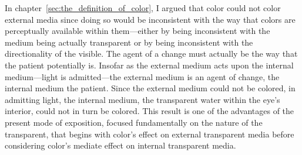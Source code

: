 In chapter~\ref{sec:the_definition_of_color}, I argued that color could not color external media since doing so would be inconsistent with the way that colors are perceptually available within them---either by being inconsistent with the medium being actually transparent or by being inconsistent with the directionality of the visible. The agent of a change must actually be the way that the patient potentially is. Insofar as the external medium acts upon the internal medium---light is admitted---the external medium is an agent of change, the internal medium the patient. Since the external medium could not be colored, in admitting light, the internal medium, the transparent water within the eye's interior, could not in turn be colored. This result is one of the advantages of the present mode of exposition, focused fundamentally on the nature of the transparent, that begins with color's effect on external transparent media before considering color's mediate effect on internal transparent media.

